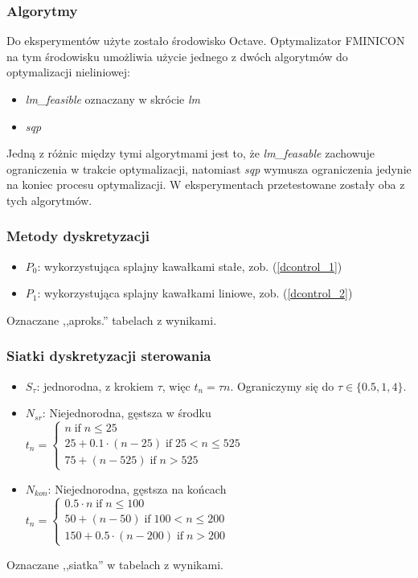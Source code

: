 \documentclass[11pt]{article}
\def\iif{\operatorname{if}}
\begin{document}
\subsubsection{Algorytmy}
Do eksperymentów użyte zostało środowisko Octave. Optymalizator FMINICON na tym środowisku umożliwia użycie jednego z dwóch algorytmów do optymalizacji nieliniowej:
\begin{itemize}
\item{\it lm\_feasible\/} oznaczany w skrócie {\it lm\/}
\item{\it sqp\/}
\end{itemize}
Jedną z różnic między tymi algorytmami jest to, że {\it lm\_feasable\/} zachowuje ograniczenia w trakcie optymalizacji, natomiast {\it sqp\/} wymusza ograniczenia jedynie na koniec procesu optymalizacji. W eksperymentach przetestowane zostały oba z tych algorytmów.
\subsubsection{Metody dyskretyzacji}
\begin{itemize}
\item{$P_0$:} wykorzystująca splajny kawałkami stałe, zob. (\ref{dcontrol_1})
\item{$P_1$:} wykorzystująca splajny kawałkami liniowe, zob. (\ref{dcontrol_2})
\end{itemize}
Oznaczane ,,aproks.'' tabelach z wynikami.
\subsubsection{Siatki dyskretyzacji sterowania}
\begin{itemize}
\item{$S_{\tau}$:} jednorodna, z krokiem $\tau$, więc $t_n = \tau n$. Ograniczymy się do $\tau \in \{0.5, 1, 4\}$.
\item{$N_{sr}$: Niejednorodna, gęstsza w środku} $t_n = \begin{cases}
    n \iif n \le 25 \\
    25 + 0.1\cdot(n-25) \iif 25 < n \le 525 \\
    75 + (n - 525) \iif n > 525
  \end{cases}$
\item{$N_{kon}$: Niejednorodna, gęstsza na końcach} $t_n = \begin{cases}
    0.5\cdot n \iif n \le 100 \\
    50 + (n - 50) \iif 100 < n \le 200 \\
    150 + 0.5\cdot (n - 200) \iif n > 200
  \end{cases}$
\end{itemize}
Oznaczane ,,siatka'' w tabelach z wynikami.
\end{document}
